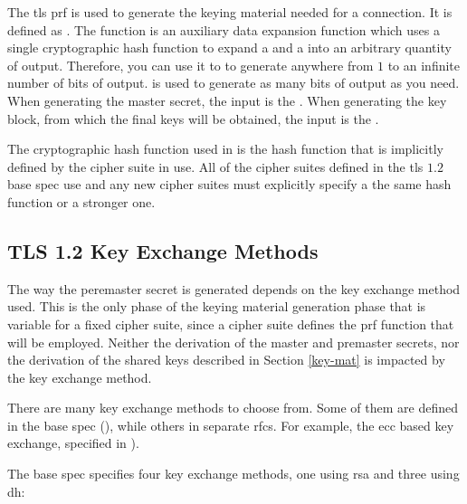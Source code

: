 \documentclass{llncs}
\begin{document}
{The \gls{tls} \gls{prf} is used to generate the keying material
needed for a connection. It is defined as .
The  function is an auxiliary data expansion function
which uses a single cryptographic hash function to expand a  and a 
into an arbitrary quantity of output. Therefore, you can use it to to generate
anywhere from $1$ to an infinite number of bits of output. 
is used to generate as many bits of output as you need. When generating the
master secret, the  input is the .
When generating the key block, from which the final keys will be obtained,
the  input is the .

The cryptographic hash function used in  is
the hash function that is implicitly defined by the cipher suite in use. All of the cipher
suites defined in the \gls{tls} $1.2$ base spec use  and any new
cipher suites must explicitly specify a the same hash function or a stronger one.

\subsection{TLS 1.2 Key Exchange Methods} \label{key-exchange}

The way the peremaster secret is generated depends on the key exchange
method used. This is the only phase of the keying material generation
phase that is variable for a fixed cipher suite, since a cipher suite defines
the \gls{prf} function that will be employed. Neither the derivation of the
master and premaster secrets, nor the derivation of the shared keys described
in Section \ref{key-mat} is impacted by the key exchange method.

There are many key exchange methods to choose from. Some of them
are defined in the base spec (\cite{RFC5246}), while others
in separate \gls{rfc}s. For example, the \gls{ecc} based key exchange, specified
in  \cite{RFC4492}).

The base spec specifies four key exchange methods, one using \gls{rsa} and
three using \gls{dh}:

}
\end{document}
